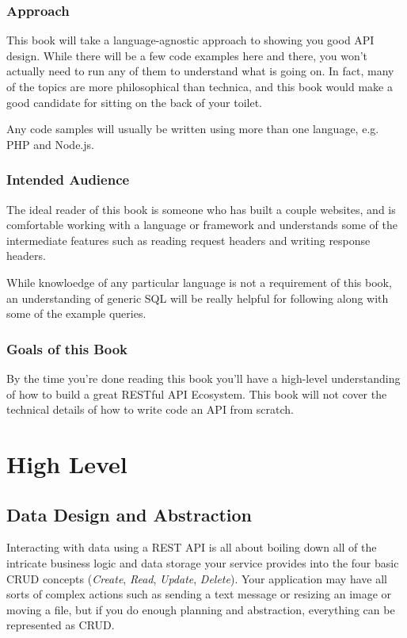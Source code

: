 \documentclass{book}
\begin{document}
\subsection{Approach}

This book will take a language-agnostic approach to showing you good API design. While there will be a few code examples here and there, you won't actually need to run any of them to understand what is going on. In fact, many of the topics are more philosophical than technica, and this book would make a good candidate for sitting on the back of your toilet.

Any code samples will usually be written using more than one language, e.g. PHP and Node.js.

\subsection{Intended Audience}

The ideal reader of this book is someone who has built a couple websites, and is comfortable working with a language or framework and understands some of the intermediate features such as reading request headers and writing response headers.

While knowloedge of any particular language is not a requirement of this book, an understanding of generic SQL will be really helpful for following along with some of the example queries.

\subsection{Goals of this Book}

By the time you're done reading this book you'll have a high-level understanding of how to build a great RESTful API Ecosystem. This book will not cover the technical details of how to write code an API from scratch.


\chapter{High Level}

\section{Data Design and Abstraction}

Interacting with data using a REST API is all about boiling down all of the intricate business logic and data storage your service provides into the four basic CRUD concepts (\emph{Create}, \emph{Read}, \emph{Update}, \emph{Delete}). Your application may have all sorts of complex actions such as sending a text message or resizing an image or moving a file, but if you do enough planning and abstraction, everything can be represented as CRUD.
\end{document}
